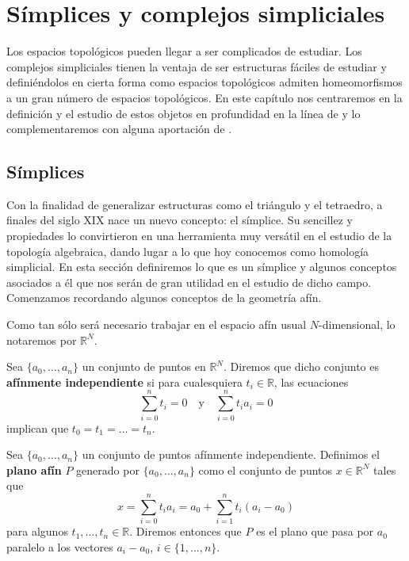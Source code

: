
\chapter{Símplices y complejos simpliciales}

Los espacios topológicos pueden llegar a ser complicados de estudiar. Los complejos simpliciales tienen la ventaja de ser estructuras fáciles de estudiar y definiéndolos en cierta forma como espacios topológicos admiten homeomorfismos a un gran número de espacios topológicos. En este capítulo nos centraremos en la definición y el estudio de estos objetos en profundidad en la línea de \cite{munkres2018elements} y lo complementaremos con alguna aportación de \cite{lee2010introduction}.

\section{Símplices}

Con la finalidad de generalizar estructuras como el triángulo y el tetraedro, 
a finales del siglo XIX nace un nuevo concepto: el símplice. Su sencillez y 
propiedades lo convirtieron en una herramienta muy versátil en el estudio de la
topología algebraica, dando lugar a lo que hoy conocemos como homología simplicial. 
En esta sección definiremos lo que es un símplice y algunos conceptos asociados a él
que nos serán de gran utilidad en el estudio de dicho campo. Comenzamos recordando algunos conceptos de la geometría afín.

Como tan sólo será necesario trabajar en el espacio afín usual $N$-dimensional, lo notaremos por $\mathbb{R}^{N}$.

\begin{definicion}
	Sea $\{a_0, \dots, a_n\}$ un conjunto de puntos en $\mathbb{R}^N$. 
	Diremos que dicho conjunto es \textbf{afínmente independiente} si 
	para cualesquiera $t_i \in \mathbb{R}$, las ecuaciones
	\[ \sum_{i=0}^{n}t_i=0 \quad \text{y} \quad \sum_{i=0}^{n}t_ia_i=0 \]
	implican que $t_0 = t_1 = \dots = t_n$.
\end{definicion}

\begin{definicion}
	Sea $\{a_0, \dots, a_n\}$ un conjunto de puntos afínmente independiente. 
	Definimos el \textbf{plano afín} $P$ generado por $\{a_0, \dots, a_n\}$ como
	el conjunto de puntos $x \in \mathbb{R}^N$ tales que
	\[ x = \sum_{i=0}^{n}t_ia_i = a_0 + \sum_{i=1}^{n}t_i(a_i - a_0) \]
	para algunos $t_1, \dots, t_n \in \mathbb{R}$. Diremos entonces que $P$ es el 
	plano que pasa por $a_0$ paralelo a los vectores $a_i - a_0$, $i \in \{1, \dots, n\}$.
\end{definicion}


